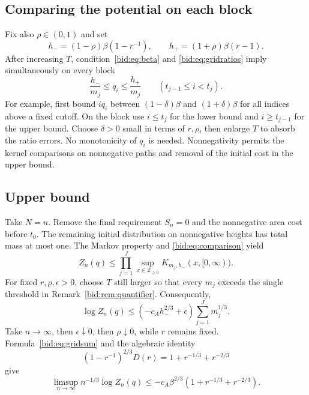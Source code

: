 \documentclass[11pt,letterpaper]{article}
\numberwithin{equation}{section}
\theoremstyle{remark}\newtheorem{remark}[theorem]{Remark}
\newcommand{\ZZ}{\mathbb Z}
\begin{document}
\subsection{Comparing the potential on each block}
Fix also $\rho\in(0,1)$ and set
\begin{equation}\label{bid:eq:hpm}
 h_-=(1-\rho)\beta(1-r^{-1}),\qquad
 h_+=(1+\rho)\beta(r-1).
\end{equation}
After increasing $T$, condition~\eqref{bid:eq:beta} and
\eqref{bid:eq:gridratios} imply simultaneously on every block
\begin{equation}\label{bid:eq:comparison}
 \frac{h_-}{m_j}\leq q_i\leq\frac{h_+}{m_j}
 \qquad(t_{j-1}\leq i<t_j).
\end{equation}
For example, first bound $iq_i$ between
$(1-\delta)\beta$ and $(1+\delta)\beta$ for all indices above a fixed
cutoff. On the block use $i\leq t_j$ for the lower bound and
$i\geq t_{j-1}$ for the upper bound. Choose $\delta>0$ small in terms
of $r,\rho$, then enlarge $T$ to absorb the ratio errors. No monotonicity
of $q_i$ is needed. Nonnegativity permits the kernel comparisons on
nonnegative paths and removal of the initial cost in the upper bound.

\subsection{Upper bound}
Take $N=n$. Remove the final requirement $S_n=0$ and the nonnegative
area cost before $t_0$. The remaining initial distribution on nonnegative
heights has total mass at most one. The Markov property and
\eqref{bid:eq:comparison} yield
\begin{equation}\label{bid:eq:upperproduct}
 Z_n(q)\leq\prod_{j=1}^J
      \sup_{x\in\ZZ_{\geq0}}K_{m_j,h_-}(x,[0,\infty)).
\end{equation}
For fixed $r,\rho,\epsilon>0$, choose $T$ still larger so that every
$m_j$ exceeds the single threshold in
Remark~\ref{bid:rem:quantifier}. Consequently,
\[
 \log Z_n(q)\leq(-c_Ah_-^{2/3}+\epsilon)
                       \sum_{j=1}^Jm_j^{1/3}.
\]
Take $n\to\infty$, then $\epsilon\downarrow0$, then
$\rho\downarrow0$, while $r$ remains fixed. Formula~\eqref{bid:eq:gridsum}
and the algebraic identity
\begin{equation}\label{bid:eq:upperconstant}
 (1-r^{-1})^{2/3}D(r)=1+r^{-1/3}+r^{-2/3}
\end{equation}
give
\begin{equation}\label{bid:eq:upperfinal}
 \limsup_{n\to\infty}n^{-1/3}\log Z_n(q)
 \leq-c_A\beta^{2/3}(1+r^{-1/3}+r^{-2/3}).
\end{equation}
\end{document}
